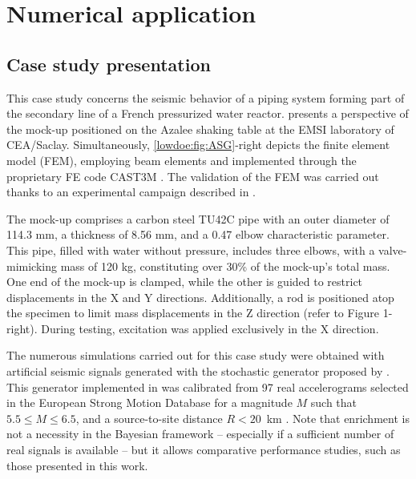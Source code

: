 



\section{Numerical application}\label{lowdoe:sec:application}

\subsection{Case study presentation}\label{lowdoe:sec:casestudy}

This case study concerns the seismic behavior of a piping system forming part of the secondary line of a French pressurized water reactor.  presents a perspective of the mock-up positioned on the Azalee shaking table at the EMSI laboratory of CEA/Saclay. Simultaneously, \cref{lowdoe:fig:ASG}-right depicts the finite element model (FEM), employing beam elements and implemented through the proprietary FE code CAST3M \citep{cea_cast3m_2019}. The validation of the FEM was carried out thanks to an experimental campaign described in \cite{touboul_seismic_1999}.

The mock-up comprises a carbon steel TU42C pipe with an outer diameter of 114.3 mm, a thickness of 8.56 mm, and a 0.47 elbow characteristic parameter. This pipe, filled with water without pressure, includes three elbows, with a valve-mimicking mass of 120 kg, constituting over 30\% of the mock-up's total mass. One end of the mock-up is clamped, while the other is guided to restrict displacements in the X and Y directions. Additionally, a rod is positioned atop the specimen to limit mass displacements in the Z direction (refer to Figure 1-right). During testing, excitation was applied exclusively in the X direction.

The numerous simulations carried out for this case study were obtained with artificial seismic signals generated with the stochastic generator proposed by \citet{rezaeian_stochastic_2010}. This generator implemented in \cite{sainct_efficient_2020} was calibrated from 97 real accelerograms selected in the European Strong Motion Database for a magnitude $M$ such that $5.5 \leq M \leq 6.5$, and a source-to-site distance $R < 20$~km \citep{ambraseys_dissemination_2000}. Note that enrichment is not a necessity in the Bayesian framework -- especially if a sufficient number of real signals is available -- but it allows comparative performance studies, such as those presented in this work.

